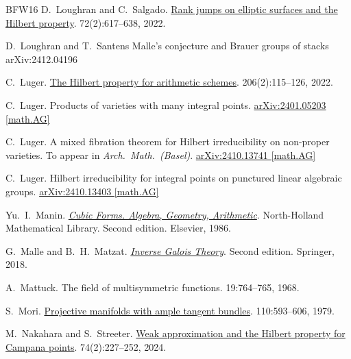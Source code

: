 \documentclass[10pt,a4paper]{amsart}
\theoremstyle{plain}
\theoremstyle{remark}
\numberwithin{theorem}{section}
\begin{document}
\begin{thebibliography}{BFW16}
D.~Loughran and C.~Salgado.
\newblock \href{https://doi.org/10.5802/aif.3457}{Rank jumps on elliptic surfaces and the Hilbert property}.
 72(2):617--638, 2022.

D.~Loughran and T.~Santens
\newblock  Malle's conjecture and Brauer groups of stacks
\newblock 	arXiv:2412.04196 

C.~Luger.
\newblock \href{https://doi.org/10.4064/aa211214-16-11}{The Hilbert property for arithmetic schemes}.
 206(2):115--126, 2022.

C.~Luger.
\newblock Products of varieties with many integral points.
\newblock \href{https://arxiv.org/abs/2401.05203v2}{arXiv:2401.05203 [math.AG]}

C.~Luger.
\newblock A mixed fibration theorem for Hilbert irreducibility on non-proper varieties.
\newblock To appear in {\em Arch.\ Math.\ (Basel)}.
\newblock \href{https://arxiv.org/abs/2410.13741}{arXiv:2410.13741 [math.AG]}

C.~Luger.
\newblock Hilbert irreducibility for integral points on punctured linear algebraic groups.
\newblock \href{https://arxiv.org/abs/2410.13403}{arXiv:2410.13403  [math.AG]}

Yu.~I.~Manin.
\newblock \href{https://www.sciencedirect.com/bookseries/north-holland-mathematical-library/vol/4/suppl/C}{\em Cubic Forms. Algebra, Geometry, Arithmetic}.
\newblock North-Holland Mathematical Library. Second edition. Elsevier, 1986.

G.~Malle and B.~H.~Matzat.
\newblock \href{https://doi.org/10.1007/978-3-662-12123-8}{\em Inverse Galois Theory}.
\newblock Second edition. Springer, 2018. 

A.~Mattuck.
\newblock The field of multisymmetric functions.
 19:764--765, 1968.
 
S.~Mori.
\newblock \href{https://doi.org/10.2307/1971241}{Projective manifolds with ample tangent bundles}. 
 110:593--606, 1979.

M.~Nakahara and S.~Streeter.
\newblock \href{https://doi.org/10.1307/mmj/20216051 }{Weak approximation and the Hilbert property for Campana points}.
 74(2):227--252, 2024. 


\end{thebibliography}
\end{document}

